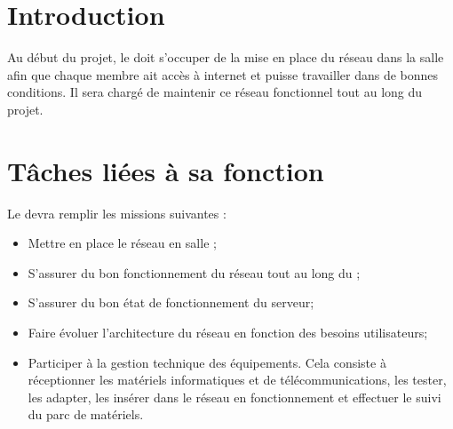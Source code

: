 \documentclass[11pt]{article}
\begin{document}

\section*{Introduction}

Au début du projet, le \RRS{} doit s'occuper de la mise en place du réseau dans la salle \PICCourt afin que chaque membre ait accès à internet et puisse travailler dans de bonnes conditions. Il sera chargé de maintenir ce réseau fonctionnel tout au long du projet.

\section*{Tâches liées à sa fonction}

Le \RRS{} devra remplir les missions suivantes :
\begin{itemize}
	\item Mettre en place le réseau en salle \PICCourt;
	\item S'assurer du bon fonctionnement du réseau tout au long du \PICCourt;
	\item S'assurer du bon état de fonctionnement du serveur;
	\item Faire évoluer l'architecture du réseau en fonction des besoins utilisateurs;
	\item Participer à la gestion technique des équipements. Cela consiste à réceptionner les matériels informatiques et de télécommunications, les tester, les adapter, les insérer dans le réseau en fonctionnement et effectuer le suivi du parc de matériels.
\end{itemize}
\end{document}

